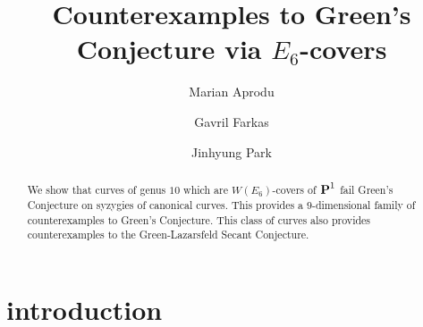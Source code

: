 \documentclass[11pt]{amsart}
\theoremstyle{definition}
\def\PP{{\textbf P}}
\begin{document}
\title{Counterexamples to Green's Conjecture via $E_6$-covers}
\author[M. Aprodu]{Marian Aprodu}
\address{M. Aprodu: 
Faculty of Mathematics and Computer Science, 
\hfill \newline\texttt{}
 \indent University of Bucharest,  and Simion Stoilow Institute of Mathematics\hfill \newline\texttt{}
 \indent P.O. Box 1-764,
RO-014700 Bucharest, Romania
}




\author[G. Farkas]{Gavril Farkas}

\address{G. Farkas: Humboldt-Universit\"at zu Berlin, Institut f\"ur Mathematik,  Unter den Linden 6
\hfill \newline\texttt{}
  Berlin, Germany} 


\author[J. Park]{Jinhyung Park}
\address{J. Park: Department of Mathematical Sciences, KAIST, 91 Daehak-ro, Yuseong-gu, 
\hfill \newline\texttt{}
  Daejeon, Republic of Korea
}

 





\begin{abstract}
We show that curves of genus $10$ which are $W(E_6)$-covers of $\PP^1$ fail Green's Conjecture on syzygies of canonical curves. This provides a $9$-dimensional family of counterexamples to Green's Conjecture. This class of curves also provides counterexamples to the Green-Lazarsfeld Secant Conjecture. 
\end{abstract}

\maketitle




\section{introduction}
\end{document}
